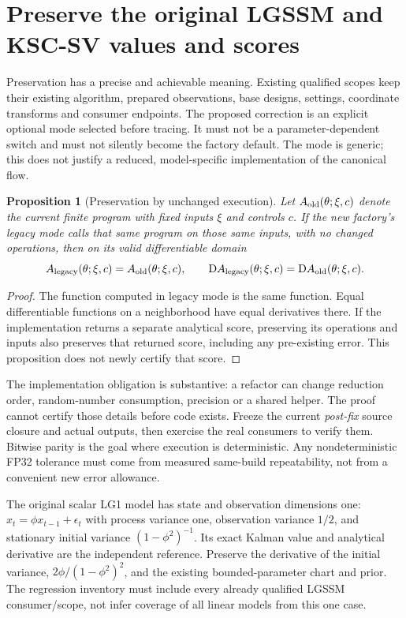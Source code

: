 \documentclass[11pt]{article}
\newtheorem{proposition}{Proposition}
\newcommand{\D}{\mathrm D}
\begin{document}
\section{Preserve the original LGSSM and KSC-SV values and scores}

Preservation has a precise and achievable meaning. Existing qualified
scopes keep their existing algorithm, prepared observations, base designs,
settings, coordinate transforms and consumer endpoints. The proposed
correction is an explicit optional mode selected before tracing. It must
not be a parameter-dependent switch and must not silently become the
factory default. The mode is generic; this does not justify a reduced,
model-specific implementation of the canonical flow.

\begin{proposition}[Preservation by unchanged execution]
\label{prop:preserve}
Let $A_{\rm old}(\theta;\xi,c)$ denote the current finite program with fixed
inputs $\xi$ and controls $c$. If the new factory's legacy mode calls
that same program on those same inputs, with no changed operations,
then on its valid differentiable domain
\begin{equation}
 A_{\rm legacy}(\theta;\xi,c)=A_{\rm old}(\theta;\xi,c),\qquad
 \D A_{\rm legacy}(\theta;\xi,c)=\D A_{\rm old}(\theta;\xi,c).
 \label{eq:preserve}
\end{equation}
\end{proposition}
\begin{proof}
The function computed in legacy mode is the same function. Equal
differentiable functions on a neighborhood have equal derivatives there.
If the implementation returns a separate analytical score, preserving its
operations and inputs also preserves that returned score, including any
pre-existing error. This proposition does not newly certify that score.
\end{proof}

The implementation obligation is substantive: a refactor can change
reduction order, random-number consumption, precision or a shared helper.
The proof cannot certify those details before code exists. Freeze the
current \emph{post-fix} source closure and actual outputs, then exercise the
real consumers to verify them. Bitwise parity is the goal where execution
is deterministic. Any nondeterministic FP32 tolerance must come from
measured same-build repeatability, not from a convenient new error allowance.

The original scalar LG1 model has state and observation dimensions one:
$x_t=\phi x_{t-1}+\epsilon_t$ with process variance one, observation
variance $1/2$, and stationary initial variance $(1-\phi^2)^{-1}$.
Its exact Kalman value and analytical derivative are the independent
reference. Preserve the derivative of the initial variance,
$2\phi/(1-\phi^2)^2$, and the existing bounded-parameter chart and prior.
The regression inventory must include every already qualified LGSSM
consumer/scope, not infer coverage of all linear models from this one case.
\end{document}
